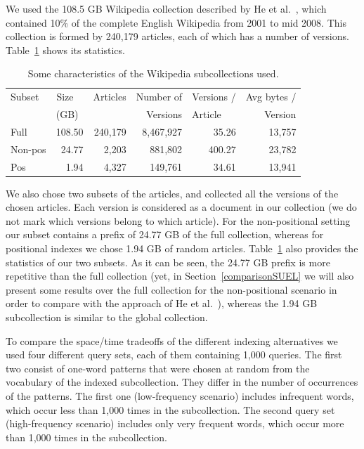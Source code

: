 \documentclass[review]{elsarticle}
\begin{document}
We used the 108.5 GB 
Wikipedia collection described by He et al.~\cite{HZS10}, which contained 10\% of 
the complete English Wikipedia from 2001 to mid 2008. This collection is formed by 240,179 articles, 
each of which has a number of versions. Table~\ref{tab:coll} shows its statistics.

\begin{table}[t]
  {\small
  \begin{center}
  \begin{tabular}{l|r|r|r|r|r}
  Subset & Size~~ & Articles & Number of & Versions / & Avg bytes / \\
	 & (GB)~  &          &  Versions & Article~~~ & Version  \\
  \hline
  Full   & 108.50 & 240,179 & 8,467,927 & 35.26 & 13,757 \\
  Non-pos  & 24.77 &   2,203 &   881,802 &400.27 & 23,782 \\
  Pos    & 1.94 &   4,327 &   149,761 & 34.61 & 13,941 

  \end{tabular}
  \end{center}
  }
  \caption{Some characteristics of the Wikipedia subcollections used.}
  \label{tab:coll}
\end{table}


We also chose two %
subsets of the 
articles, and collected all the versions of the chosen articles. Each version 
is considered as a document in our collection (we do not mark which versions belong to which article). For the non-positional setting 
our subset contains a prefix of 24.77 GB of the full collection, whereas for positional indexes we
chose 1.94 GB of random articles. 
Table~\ref{tab:coll} also provides the statistics of our two subsets. As it can be 
seen, the 24.77 GB prefix is more repetitive than the full collection (yet, in 
Section~\ref{comparisonSUEL} we will also
present some results over the full collection for the non-positional scenario in order to
compare with the approach of He et al.~\cite{HZS10}), whereas
the 1.94 GB subcollection is similar to the global collection.

To compare the space/time tradeoffs of the different indexing alternatives we used four 
different query sets, each of them containing 1,000 queries.
The first two consist of one-word patterns that were chosen at random from the 
vocabulary of the indexed subcollection. They differ in the number of occurrences of
the patterns. The first one (low-frequency scenario) includes infrequent words, which 
occur less than 1,000 times in the subcollection. The second query set (high-frequency scenario) 
includes only very frequent words, which occur more than 1,000 times in the subcollection.
\end{document}
